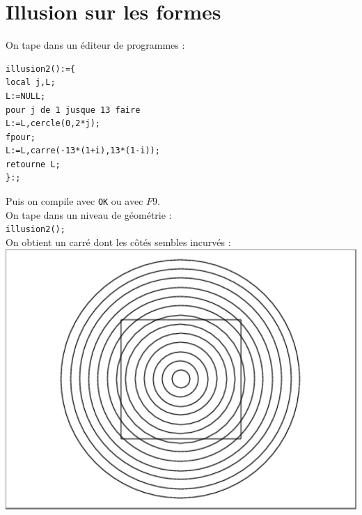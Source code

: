 \documentclass[a4paper,11pt]{book}
\begin{document}
\section{Illusion sur les formes}
On tape dans un \'editeur de programmes :
\begin{verbatim}
illusion2():={
local j,L;
L:=NULL;
pour j de 1 jusque 13 faire
L:=L,cercle(0,2*j);
fpour;
L:=L,carre(-13*(1+i),13*(1-i));
retourne L;
}:;
\end{verbatim}
Puis on compile avec {\tt OK} ou avec $F9$.\\
On tape dans un niveau de g\'eom\'etrie :\\
{\tt illusion2();}\\
On obtient un carr\'e dont les c\^ot\'es sembles incurv\'es :\\
\includegraphics[width=\textwidth]{illusion2}
\end{document}
